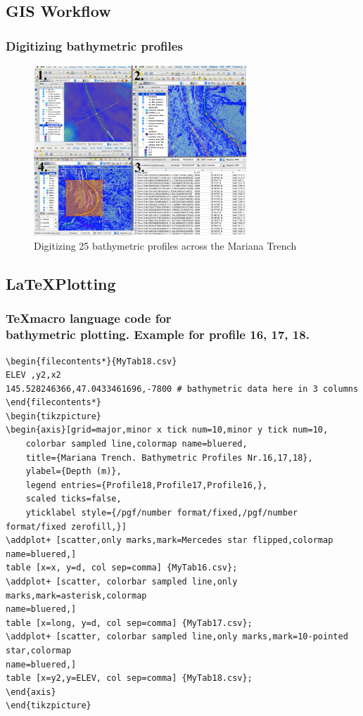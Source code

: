 \documentclass[pdflatex,compress,10pt,
	xcolor={dvipsnames,dvipsnames,svgnames,x11names,table},
	hyperref={colorlinks = true,breaklinks = true, urlcolor = NavyBlue, breaklinks = true}]{beamer}
\begin{document}
\subsection{GIS Workflow}
\begin{frame}
\frametitle{Digitizing bathymetric profiles}

\begin{figure}[H]
	\centering
		\includegraphics[width=8cm]{Fig-2-2.jpg}
	\caption{Digitizing 25 bathymetric profiles across the Mariana Trench}\label{fig:2-2}
\end{figure}		
\end{frame}

\subsection{\LaTeX \space Plotting}

\begin{frame}[fragile]\frametitle{\TeX \space macro language code for \\bathymetric plotting. Example for profile 16, 17, 18.}
\begin{Verbatim}[fontsize=\scriptsize]
\begin{filecontents*}{MyTab18.csv}
ELEV ,y2,x2
145.528246366,47.0433461696,-7800 # bathymetric data here in 3 columns 
\end{filecontents*}
\begin{tikzpicture}
\begin{axis}[grid=major,minor x tick num=10,minor y tick num=10,
	colorbar sampled line,colormap name=bluered,
	title={Mariana Trench. Bathymetric Profiles Nr.16,17,18},
	ylabel={Depth (m)},
	legend entries={Profile18,Profile17,Profile16,},
	scaled ticks=false,
	yticklabel style={/pgf/number format/fixed,/pgf/number format/fixed zerofill,}]
\addplot+ [scatter,only marks,mark=Mercedes star flipped,colormap name=bluered,]
table [x=x, y=d, col sep=comma] {MyTab16.csv};
\addplot+ [scatter, colorbar sampled line,only marks,mark=asterisk,colormap
name=bluered,] 
table [x=long, y=d, col sep=comma] {MyTab17.csv};
\addplot+ [scatter, colorbar sampled line,only marks,mark=10-pointed star,colormap
name=bluered,] 
table [x=y2,y=ELEV, col sep=comma] {MyTab18.csv}; 
\end{axis} 
\end{tikzpicture}
\end{Verbatim}
\end{frame}
\end{document}
